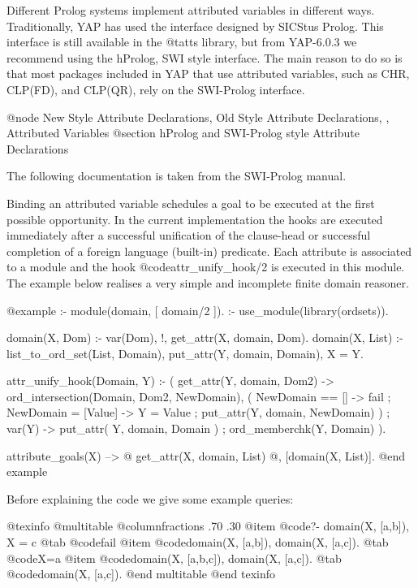 Different Prolog systems implement attributed variables in different
ways. Traditionally, YAP has used the interface designed by SICStus
Prolog. This interface is still
available in the @t{atts} library, but from YAP-6.0.3 we recommend using
the hProlog, SWI style interface. The main reason to do so is that 
most packages included in YAP that use attributed variables, such as CHR, CLP(FD), and CLP(QR),
rely on the SWI-Prolog interface.


@node New Style Attribute Declarations, Old Style Attribute Declarations, , Attributed Variables
@section hProlog and SWI-Prolog style Attribute Declarations

The following documentation is taken from the SWI-Prolog manual.

Binding an attributed variable schedules a goal to be executed at the
first possible opportunity. In the current implementation the hooks are
executed immediately after a successful unification of the clause-head
or successful completion of a foreign language (built-in) predicate. Each
attribute is associated to a module and the hook @code{attr_unify_hook/2} is
executed in this module.  The example below realises a very simple and
incomplete finite domain reasoner.

@example
:- module(domain,
      [ domain/2            %
      ]).
:- use_module(library(ordsets)).

domain(X, Dom) :-
    var(Dom), !,
    get_attr(X, domain, Dom).
domain(X, List) :-
    list_to_ord_set(List, Domain),
    put_attr(Y, domain, Domain),
    X = Y.


attr_unify_hook(Domain, Y) :-
    (   get_attr(Y, domain, Dom2)
    ->  ord_intersection(Domain, Dom2, NewDomain),
        (   NewDomain == []
        ->    fail
        ;    NewDomain = [Value]
        ->    Y = Value
        ;    put_attr(Y, domain, NewDomain)
        )
    ;   var(Y)
    ->  put_attr( Y, domain, Domain )
    ;   ord_memberchk(Y, Domain)
    ).


attribute_goals(X) -->
    @{ get_attr(X, domain, List) @},
    [domain(X, List)].
@end example


Before explaining the code we give some example queries:

@texinfo
@multitable @columnfractions .70 .30
            @item @code{?- domain(X, [a,b]), X = c}
@tab @code{fail}
@item @code{domain(X, [a,b]), domain(X, [a,c]).}
           @tab @code{X=a}
    @item @code{domain(X, [a,b,c]), domain(X, [a,c]).}
     @tab @code{domain(X, [a,c]).}
    @end multitable
@end texinfo


